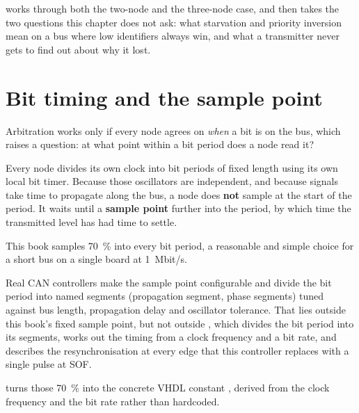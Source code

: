  works through both the two-node and the three-node case, and then takes the two questions
this chapter does not ask: what starvation and priority inversion mean on a bus where low identifiers
always win, and what a transmitter never gets to find out about why it lost.

\section{Bit timing and the sample point}
\label{c10:sec:bittiming}

Arbitration works only if every node agrees on \emph{when} a bit is on the bus, which raises a
question: at what point within a bit period does a node read it?

Every node divides its own clock into bit periods of fixed length using its own local bit timer.
Because those oscillators are independent, and because signals take time to propagate along the bus,
a node does \textbf{not} sample at the start of the period. It waits until a \textbf{sample point}
further into the period, by which time the transmitted level has had time to settle.

This book samples 70~\% into every bit period, a reasonable and simple choice for a short bus on a
single board at 1~Mbit/s.

Real CAN controllers make the sample point configurable and divide the bit period into named segments
(propagation segment, phase segments) tuned against bus length, propagation delay and oscillator
tolerance. That lies outside this book's fixed sample point, but not outside , which
divides the bit period into its segments, works out the timing from a clock frequency and a bit rate,
and describes the resynchronisation at every edge that this controller replaces with a single pulse
at SOF.

 turns those 70~\% into the concrete VHDL constant , derived
from the clock frequency and the bit rate rather than hardcoded.
